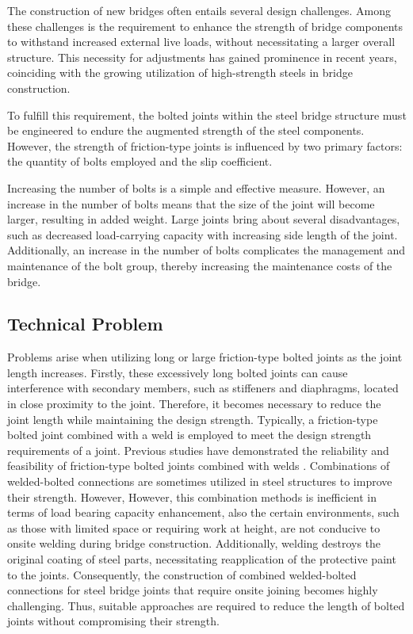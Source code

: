 The construction of new bridges often entails several design challenges. Among these challenges is the requirement to enhance the strength of bridge components to withstand increased external live loads, without necessitating a larger overall structure. This necessity for adjustments has gained prominence in recent years, coinciding with the growing utilization of high-strength steels in bridge construction.

To fulfill this requirement, the bolted joints within the steel bridge structure must be engineered to endure the augmented strength of the steel components. However, the strength of friction-type joints is influenced by two primary factors: the quantity of bolts employed and the slip coefficient. 

Increasing the number of bolts is a simple and effective measure. However, an increase in the number of bolts means that the size of the joint will become larger, resulting in added weight. Large joints bring about several disadvantages, such as decreased load-carrying capacity with increasing side length of the joint. Additionally, an increase in the number of bolts complicates the management and maintenance of the bolt group, thereby increasing the maintenance costs of the bridge.

\subsection{Technical Problem} %
Problems arise when utilizing long or large friction-type bolted joints as the joint length increases. Firstly, these excessively long bolted joints can cause interference with secondary members, such as stiffeners and diaphragms, located in close proximity to the joint. Therefore, it becomes necessary to reduce the joint length while maintaining the design strength. Typically, a friction-type bolted joint combined with a weld is employed to meet the design strength requirements of a joint. Previous studies have demonstrated the reliability and feasibility of friction-type bolted joints combined with welds \cite{solodov2021,Thomas2000,Chang2019361,KHANDEL2022107036}. Combinations of welded-bolted connections are sometimes utilized in steel structures to improve their strength. However, However, this combination methods is inefficient in terms of load bearing capacity enhancement, also the certain environments, such as those with limited space or requiring work at height, are not conducive to onsite welding during bridge construction. Additionally, welding destroys the original coating of steel parts, necessitating reapplication of the protective paint to the joints. Consequently, the construction of combined welded-bolted connections for steel bridge joints that require onsite joining becomes highly challenging. Thus, suitable approaches are required to reduce the length of bolted joints without compromising their strength.

